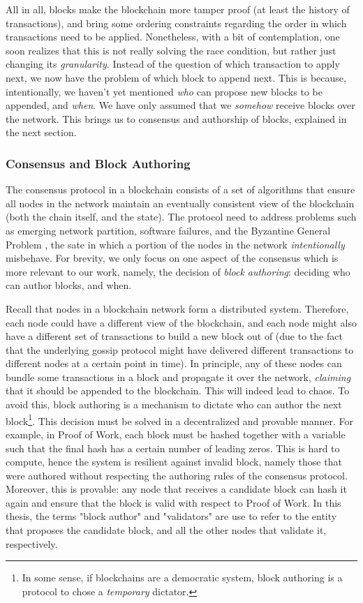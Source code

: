 All in all, blocks make the blockchain more tamper proof (at least the history of transactions), and
bring some ordering constraints regarding the order in which transactions need to be applied.
Nonetheless, with a bit of contemplation, one soon realizes that this is not really solving the race
condition, but rather just changing its \textit{granularity}. Instead of the question of which
transaction to apply next, we now have the problem of which block to append next. This is because,
intentionally, we haven't yet mentioned \textit{who} can propose new blocks to be appended, and
\textit{when}. We have only assumed that we \textit{somehow} receive blocks over the network. This
brings us to consensus and authorship of blocks, explained in the next section.

\subsubsection{Consensus and Block Authoring} \label{chap_bg:subsec:consensus_authorship}

The consensus protocol in a blockchain consists of a set of algorithms that ensure all nodes in the
network maintain an eventually consistent view of the blockchain (both the chain itself, and the
state). The protocol need to address problems such as emerging network partition, software failures,
and the Byzantine General Problem \cite{lamportByzantineGeneralsProblem1982}, the sate in which a
portion of the nodes in the network \textit{intentionally} misbehave. For brevity, we only focus on
one aspect of the consensus which is more relevant to our work, namely, the decision of
\textit{block authoring}: deciding who can author blocks, and when.

Recall that nodes in a blockchain network form a distributed system. Therefore, each node could have
a different view of the blockchain, and each node might also have a different set of transactions to
build a new block out of (due to the fact that the underlying gossip protocol might have delivered
different transactions to different nodes at a certain point in time). In principle, any of these
nodes can bundle some transactions in a block and propagate it over the network, \textit{claiming}
that it should be appended to the blockchain. This will indeed lead to chaos. To avoid this, block
authoring is a mechanism to dictate who can author the next block\footnote{In some sense, if
blockchains are a democratic system, block authoring is a protocol to chose a \textit{temporary}
dictator.}. This decision must be solved in a decentralized and provable manner. For example, in
Proof of Work, each block must be hashed together with a variable such that the final hash has a
certain number of leading zeros. This is hard to compute, hence the system is resilient against
invalid block, namely those that were authored without respecting the authoring rules of the
consensus protocol. Moreover, this is provable: any node that receives a candidate block can hash it
again and ensure that the block is valid with respect to Proof of Work. In this thesis, the terms
"block author" and "validators" are use to refer to the  entity that proposes the candidate block,
and all the other nodes that validate it, respectively.

